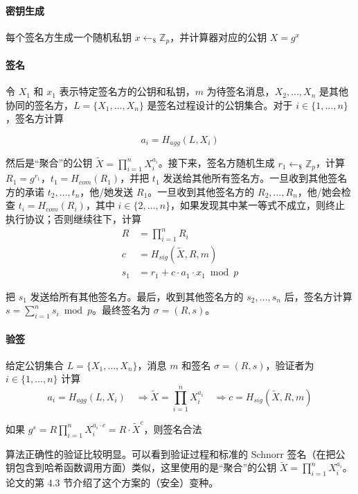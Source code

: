 \documentclass[a4paper,10pt]{article}
\begin{document}
\paragraph{密钥生成}
每个签名方生成一个随机私钥 \(x\leftarrow_{\$} \mathbb{Z}_p\)，并计算器对应的公钥 \(X=g^x\)

\paragraph{签名}
令 \(X_1\) 和 \(x_1\) 表示特定签名方的公钥和私钥，\(m\) 为待签名消息，\(X_2,\dots,X_n\) 是其他协同的签名方，\(L=\{X_1,\dots,X_n\}\) 是签名过程设计的公钥集合。对于 \(i\in\{1,\dots,n\}\)，签名方计算

\[ a_i=H_{agg}(L,X_i) \]

然后是“聚合”的公钥 \(\tilde{X}=\prod_{i=1}^nX_i^{a_i}\)。接下来，签名方随机生成 \(r_1\leftarrow_{\$} \mathbb{Z}_p\)，计算
\(R_1=g^{r_1}\)，\(t_1=H_{com}(R_1)\)，并把 \(t_1\) 发送给其他所有签名方。一旦收到其他签名方的承诺 \(t_2,\dots,t_n\)，他/她发送
\(R_1\)。一旦收到其他签名方的 \(R_2,\dots,R_n\)，他/她会检查 \(t_i=H_{com}(R_i)\)，其中 \(i\in\{2,\dots,n\}\)，如果发现其中某一等式不成立，则终止执行协议；否则继续往下，计算
\begin{align*}
  R &=\prod_{i=1}^n R_i \\
  c &= H_{sig}(\tilde{X},R,m) \\
  s_1 &= r_1+c\cdot a_1\cdot x_1 \bmod p
\end{align*}

把 \(s_1\) 发送给所有其他签名方。最后，收到其他签名方的 \(s_2,\dots,s_n\) 后，签名方计算 \(s=\sum_{i=1}^n s_i \bmod p\)。最终签名为 \(\sigma=(R,s)\)。

\paragraph{验签}
给定公钥集合 \(L=\{X_1,\dots,X_n\}\)，消息 \(m\) 和签名 \(\sigma=(R,s)\)，验证者为 \(i\in\{1,\dots,n\}\) 计算
\[ 
a_i=H_{agg}(L,X_i)\quad \Rightarrow \tilde{X}=\prod_{i=1}^n X_i^{a_i}\quad \Rightarrow c=H_{sig}(\tilde{X},R,m)
\]

如果 \(g^s=R\prod_{i=1}^n X_i^{a_i\cdot c}=R\cdot \tilde{X}^c\)，则签名合法

算法正确性的验证比较明显。可以看到验证过程和标准的 Schnorr 签名（在把公钥包含到哈希函数调用方面）类似，这里使用的是“聚合”的公钥 \(\tilde{X}=\prod_{i=1}^n X_i^{a_i}\)。论文的第 4.3 节介绍了这个方案的（安全）变种。
\end{document}
